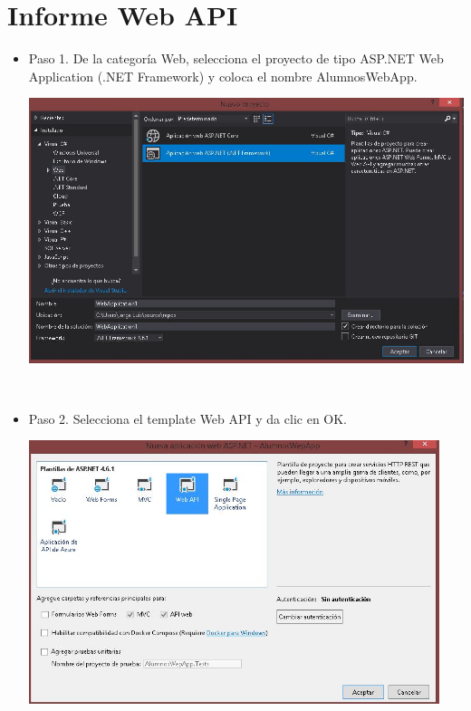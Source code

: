 \section{Informe Web API} 
\begin{flushleft}


\begin{itemize}
\textbf{Parte1: Creación del servicio REST Web API }\\
\textbf{ }\\
  \item Paso 1. De la categoría Web, selecciona el proyecto de tipo ASP.NET Web Application (.NET Framework) y coloca el nombre AlumnosWebApp.

\begin{center}
	\includegraphics[width=16cm]{./Imagenes/paso1} 
	\end{center}
\textbf{ }\\
\item Paso 2. Selecciona el template Web API y da clic en OK.
\begin{center}
	\includegraphics[width=12cm]{./Imagenes/paso2} 
	\end{center}


\end{itemize}
\end{flushleft}
